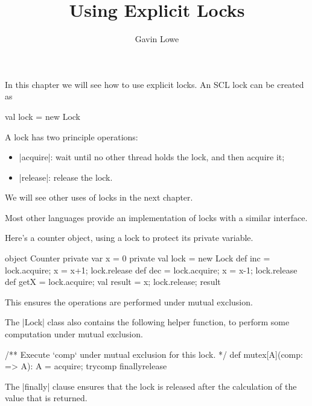 \documentclass[notes,color]{sepslide0}
\title{Using Explicit Locks}
\author{Gavin Lowe}
\begin{document}
\begin{slide}
  
  \Title

\end{slide}


\begin{slide}

In this chapter we will see how to use explicit locks.  An SCL lock can be
created as
%
\begin{scala}
val lock = new Lock
\end{scala}

A lock has two principle operations:
%
\begin{itemize}
\item |acquire|: wait until no other thread holds the lock, and then acquire
  it;

\item |release|: release the lock.
\end{itemize}

We will see other uses of locks in the next chapter. 

Most other languages provide an implementation of locks with a similar
interface. 
\end{slide}


\begin{slide}

Here's a counter object, using a lock to protect its private variable.
%
\begin{scala}
object Counter{
  private var x = 0
  private val lock = new Lock
  def inc = { lock.acquire; x = x+1; lock.release }
  def dec = { lock.acquire; x = x-1; lock.release }
  def getX = { lock.acquire; val result = x; lock.release; result }
}
\end{scala}
%
This ensures the operations are performed under mutual exclusion. 
\end{slide}


\begin{slide}

The |Lock| class also contains the following helper function, to perform some
computation under mutual exclusion. 
\begin{scala}
  /** Execute `comp` under mutual exclusion for this lock. */
  def mutex[A](comp: => A): A = {
    acquire; try{comp} finally{release}
  } 
\end{scala}
%
The |finally| clause ensures that the lock is released after the calculation
of the value that is returned.
\end{slide}
\end{document}
